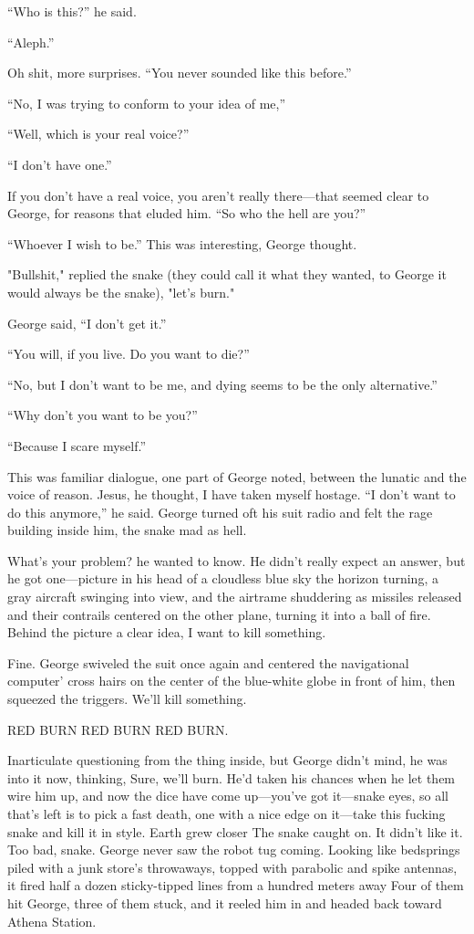 ``Who is this?'' he said.

``Aleph.''

Oh shit, more surprises. ``You never sounded like this before.''

``No, I was trying to conform to your idea of me,''

``Well, which is your real voice?''

``I don't have one.''

If you don't have a real voice, you aren't really there—that seemed clear to George, for reasons that eluded him. ``So who the hell are you?''

``Whoever I wish to be.'' This was interesting, George thought.

"Bullshit," replied the snake (they could call it what they wanted, to George it would always be the snake), "let's burn."

George said, ``I don't get it.''

``You will, if you live. Do you want to die?''

``No, but I don't want to be me, and dying seems to be the only alternative.''

``Why don't you want to be you?''

``Because I scare myself.''

This was familiar dialogue, one part of George noted, between the lunatic and the voice of reason. Jesus, he thought, I have taken myself hostage. ``I don't want to do this anymore,'' he said. George turned oft his suit radio and felt the rage building inside him, the snake mad as hell.

What's your problem? he wanted to know. He didn't really expect an answer, but he got one—picture in his head of a cloudless blue sky the horizon turning, a gray aircraft swinging into view, and the airtrame shuddering as missiles released and their contrails centered on the other plane, turning it into a ball of fire. Behind the picture a clear idea, I want to kill something.

Fine. George swiveled the suit once again and centered the navigational computer' cross hairs on the center of the blue-white globe in front of him, then squeezed the triggers. We'll kill something.

RED BURN RED BURN RED BURN.

Inarticulate questioning from the thing inside, but George didn't mind, he was into it now, thinking, Sure, we'll burn. He'd taken his chances when he let them wire him up, and now the dice have come up—you've got it—snake eyes, so all that's left is to pick a fast death, one with a nice edge on it—take this fucking snake and kill it in style. Earth grew closer The snake caught on. It didn't like it. Too bad, snake. George never saw the robot tug coming. Looking like bedsprings piled with a junk store's throwaways, topped with parabolic and spike antennas, it fired half a dozen sticky-tipped lines from a hundred meters away Four of them hit George, three of them stuck, and it reeled him in and headed back toward Athena Station.

